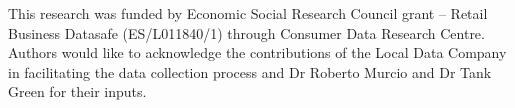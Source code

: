 This research was funded by Economic Social Research Council grant – Retail
Business Datasafe (ES/L011840/1) through Consumer Data Research Centre.  Authors
would like to acknowledge the contributions of the Local Data Company in
facilitating the data collection process and Dr Roberto Murcio and Dr Tank Green
for their inputs.
